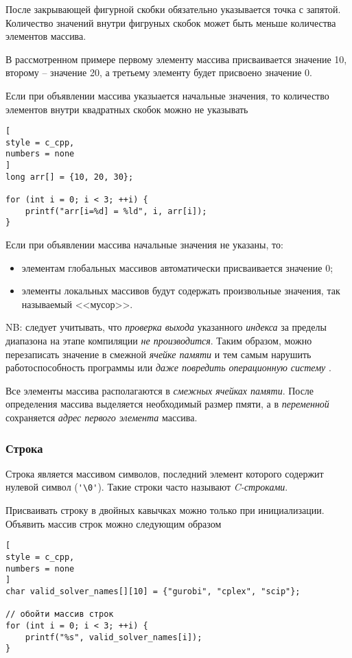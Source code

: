 \documentclass[%
	11pt,
	a4paper,
	utf8,
		]{article}
\begin{document}
После закрывающей фигурной скобки обязательно указывается точка с запятой. Количество значений внутри фигруных скобок может быть меньше количества элементов массива.

В рассмотренном примере первому элементу массива присваивается значение 10, второму -- значение 20, а третьему элементу будет присвоено значение 0.

Если при объявлении массива указыается начальные значения, то количество элементов внутри квадратных скобок можно не указывать
\begin{lstlisting}[
style = c_cpp,
numbers = none
]
long arr[] = {10, 20, 30};

for (int i = 0; i < 3; ++i) {
    printf("arr[i=%d] = %ld", i, arr[i]);
}
\end{lstlisting}

Если при объявлении массива начальные значения не указаны, то:
\begin{itemize}
	\item элементам глобальных массивов автоматически присваивается значение 0;
	
	\item элементы локальных массивов будут содержать произвольные значения, так называемый <<мусор>>.
\end{itemize}

NB: следует учитывать, что \emph{проверка выхода} указанного \emph{индекса} за пределы диапазона на этапе компиляции \emph{\color{red}не производится}. Таким образом, можно перезаписать значение в смежной \emph{ячейке памяти} и тем самым нарушить работоспособность программы или \emph{даже повредить операционную систему} \cite[]{prokhorenok-prog-c:2020}.

Все элементы массива располагаются в \emph{смежных ячейках памяти}. После определения массива выделяется необходимый размер пмяти, а в \emph{переменной} сохраняется \emph{адрес первого элемента} массива.

\subsubsection{Строка}

Строка является массивом символов, последний элемент которого содержит нулевой символ (\verb*|'\0'|). Такие строки часто называют \emph{C-строками}.

Присваивать строку в двойных кавычках можно только при инициализации. Объявить массив строк можно следующим образом
\begin{lstlisting}[
style = c_cpp,
numbers = none
]
char valid_solver_names[][10] = {"gurobi", "cplex", "scip"};

// обойти массив строк
for (int i = 0; i < 3; ++i) {
    printf("%s", valid_solver_names[i]);
}
\end{lstlisting}
\end{document}
